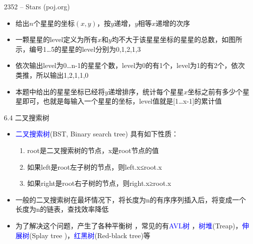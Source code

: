 \begin{frame}{2352 -- Stars (poj.org)}
    \begin{itemize}
        \item  给出$n$个星星的坐标$(x,y)$，按$y$递增，$y$相等$x$递增的次序
        \item 一颗星星的level定义为所有$x$和$y$均不大于该星星坐标的星星的总数，如图所示，编号1…5的星星的level分别为0,1,2,1,3
        \item 依次输出level为0…n-1的星星个数，level为0的有1个，level为1的有2个，依次类推，所以输出1,2,1,1,0
    \end{itemize}
    \usetikzlibrary {shapes.geometric}
    \begin{center}
    \end{center}
    \begin{itemize}
        \item  本题中给出的星星坐标已经将$y$递增排序，统计每个星星$x$坐标之前有多少个星星即可，也就是每输入一个星星的坐标，level值就是[1…x-1]的累计值
    \end{itemize}
\end{frame}
\begin{frame}{6.4 二叉搜索树}
    \begin{itemize}
        \item  \textcolor{blue}{二叉搜索树}(BST, Binary search tree) 具有如下性质：
        \begin{enumerate}[(1)]
            \item root是二叉搜索树的节点，x是root节点的值
            \item 如果left是root左子树的节点，则left.x≤root.x
            \item 如果right是root右子树的节点，则right.x≥root.x
        \end{enumerate}
        \vfill
        \item 一般的二叉搜索树在最坏情况下，将长度为n的有序序列插入后，将变成一个长度为n的链表，查找效率降低
        \vfill
        \item 为了解决这个问题，产生了各种平衡树 ，常见的有\textcolor{blue}{AVL树} ，\textcolor{blue}{树堆}(Treap)，\textcolor{blue}{伸展树}(Splay tree )，\textcolor{blue}{红黑树}(Red-black tree)等
    \end{itemize}
\end{frame}
